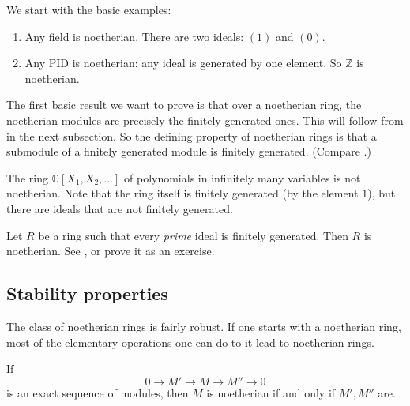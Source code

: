 We start with the basic examples:

\begin{example} 
\begin{enumerate}
\item Any field is noetherian. There are two ideals: $(1)$ and $(0)$. 
\item Any PID is noetherian: any ideal is generated by one element. So
$\mathbb{Z}$ is noetherian.
\end{enumerate}
\end{example} 

The first basic result we want to prove is that over a noetherian ring, the
noetherian modules are precisely the finitely generated ones.  This will
follow from  in the next subsection. So the defining 
property of noetherian rings is that a submodule of a finitely generated
module is finitely generated. (Compare
.)

\begin{exercise} 
The ring $\mathbb{C}[X_1, X_2, \dots]$ of polynomials in infinitely many
variables is not noetherian. Note that the ring itself is finitely generated
(by the element $1$), but there are ideals that are not finitely generated.
\end{exercise} 

\begin{remark} 
Let $R$ be a ring such that every \emph{prime} ideal is finitely generated.
Then $R$ is noetherian. See , or prove it as
an exercise. \end{remark}

\subsection{Stability properties}

The class of noetherian rings is fairly robust. If one starts with a
noetherian ring, most of the elementary operations one can do to it lead to
noetherian rings.

\begin{proposition} \label{exactnoetherian}
If 
\[ 0 \to M' \to  M \to M'' \to 0  \]
is an exact sequence of modules, then $M$ is noetherian if and only if $M',
M''$ are.
\end{proposition} 

